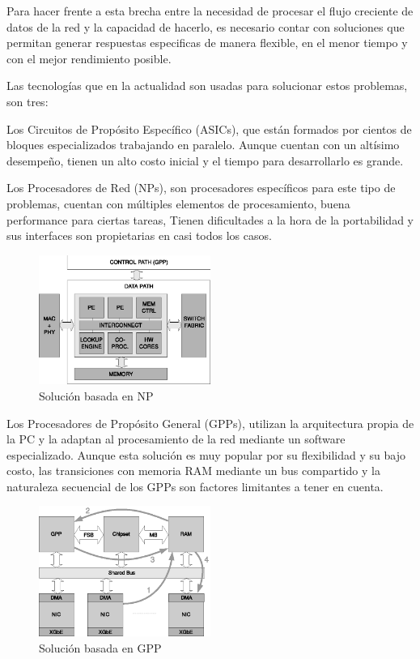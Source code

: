 
Para hacer frente a esta brecha entre la necesidad de procesar el flujo creciente de datos de la red y la capacidad de hacerlo, es necesario contar con soluciones que permitan generar respuestas especificas de manera flexible, en el menor tiempo y con el mejor rendimiento posible.

Las tecnologías que en la actualidad son usadas para solucionar estos problemas, son tres:

Los Circuitos de Propósito Específico (ASICs), que están formados por cientos de bloques especializados trabajando en paralelo. Aunque cuentan con un altísimo desempeño, tienen un alto costo inicial y el tiempo para desarrollarlo es grande.

Los Procesadores de Red (NPs), son procesadores específicos para este tipo de problemas, cuentan con múltiples elementos de procesamiento, buena performance para ciertas tareas, Tienen dificultades a la hora de la portabilidad y sus interfaces son propietarias en casi todos los casos.
\begin{figure}[h]
  \centering
      \includegraphics[width=0.5\textwidth]{1-introduccion/graf/NP_based.eps}
  \caption{Solución basada en NP}
  \label{fig:diseno}
\end{figure}
\newpage

Los Procesadores de Propósito General (GPPs), utilizan la arquitectura propia de la PC y la adaptan al procesamiento de la red mediante un software especializado. Aunque esta solución es muy popular por su flexibilidad y su bajo costo, las transiciones con memoria RAM mediante un bus compartido y la naturaleza secuencial de los GPPs son factores limitantes a tener en cuenta. 
 \begin{figure}[h]
  \centering
      \includegraphics[width=0.5\textwidth]{1-introduccion/graf/GPP_based.eps}
  \caption{Solución basada en GPP}
  \label{fig:diseno}
\end{figure}

